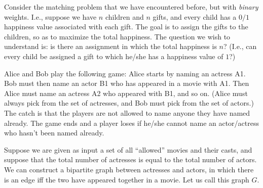 \documentclass[addpoints]{exam}
\begin{document}
\begin{questions}
Consider the matching problem that we have encountered before, but with {\em binary} weights. I.e., suppose we have $n$ children and $n$ gifts, and every child has a $0/1$ happiness value associated with each gift. The goal is to assign the gifts to the children, so as to maximize the total happiness. The question we wish to understand is: is there an assignment in which the total happiness is $n$? (I.e., can every child be assigned a gift to which he/she has a happiness value of $1$?)


Alice and Bob play the following game: Alice starts by naming an actress A1. Bob must then name an actor B1 who has appeared in a movie with A1. Then Alice must name an actress A2 who appeared with B1, and so on. (Alice must always pick from the set of actresses, and Bob must pick from the set of actors.) The catch is that the players are not allowed to name anyone they have named already. The game ends and a player loses if he/she cannot name an actor/actress who hasn't been named already.

Suppose we are given as input a set of all ``allowed'' movies and their casts, and suppose that the total number of actresses is equal to the total number of actors. We can construct a bipartite graph between actresses and actors, in which there is an edge iff the two have appeared together in a movie. Let us call this graph $G$.  

\begin{parts}

\end{parts}
\end{questions}
\end{document}
